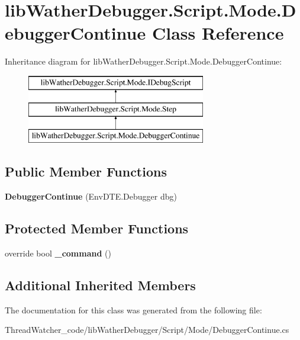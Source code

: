\hypertarget{classlib_wather_debugger_1_1_script_1_1_mode_1_1_debugger_continue}{\section{lib\+Wather\+Debugger.\+Script.\+Mode.\+Debugger\+Continue Class Reference}
\label{classlib_wather_debugger_1_1_script_1_1_mode_1_1_debugger_continue}
}
Inheritance diagram for lib\+Wather\+Debugger.\+Script.\+Mode.\+Debugger\+Continue\+:\begin{figure}[H]
\begin{center}
\leavevmode
\includegraphics[height=3.000000cm]{classlib_wather_debugger_1_1_script_1_1_mode_1_1_debugger_continue}
\end{center}
\end{figure}
\subsection*{Public Member Functions}
\begin{DoxyCompactItemize}
\item 
\hypertarget{classlib_wather_debugger_1_1_script_1_1_mode_1_1_debugger_continue_ad5ec1dff65befe953747ce6666c5a303}{{\bfseries Debugger\+Continue} (Env\+D\+T\+E.\+Debugger dbg)}\label{classlib_wather_debugger_1_1_script_1_1_mode_1_1_debugger_continue_ad5ec1dff65befe953747ce6666c5a303}

\end{DoxyCompactItemize}
\subsection*{Protected Member Functions}
\begin{DoxyCompactItemize}
\item 
\hypertarget{classlib_wather_debugger_1_1_script_1_1_mode_1_1_debugger_continue_a4f828cf2abdfcf75a781353cffee0f95}{override bool {\bfseries \+\_\+command} ()}\label{classlib_wather_debugger_1_1_script_1_1_mode_1_1_debugger_continue_a4f828cf2abdfcf75a781353cffee0f95}

\end{DoxyCompactItemize}
\subsection*{Additional Inherited Members}


The documentation for this class was generated from the following file\+:\begin{DoxyCompactItemize}
\item 
Thread\+Watcher\+\_\+code/lib\+Wather\+Debugger/\+Script/\+Mode/Debugger\+Continue.\+cs\end{DoxyCompactItemize}
